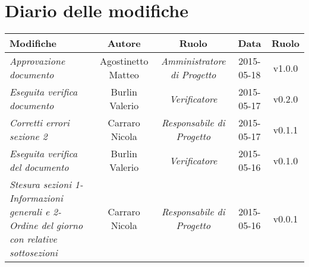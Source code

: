 \newpage
\section*{Diario delle modifiche}

\begin{table}[h]
\centering
\begin{tabular}{|p{}|c|c|c|c|}
	\toprule
		\textbf{Modifiche} & \textbf{Autore} & \textbf{Ruolo} & \textbf{Data} & \textbf{Ruolo} \\
	\midrule
	\midrule
		\textit{Approvazione documento} & Agostinetto Matteo & \textit{Amministratore di Progetto} & 2015-05-18 & v1.0.0 \\
	\midrule
		\textit{Eseguita verifica documento} & Burlin Valerio & \textit{Verificatore} & 2015-05-17 & v0.2.0 \\
	\midrule
		\textit{Corretti errori sezione 2} & Carraro Nicola & \textit{Responsabile di Progetto} & 2015-05-17 & v0.1.1 \\
	\midrule
		\textit{Eseguita verifica del documento} & Burlin Valerio & \textit{Verificatore} & 2015-05-16 & v0.1.0 \\
    \midrule
	    \textit{Stesura sezioni 1-Informazioni generali e 2-Ordine del giorno con relative sottosezioni} & Carraro Nicola & \textit{Responsabile di Progetto} & 2015-05-16 & v0.0.1 \\
	\bottomrule
\end{tabular}	
\end{table}
\newpage